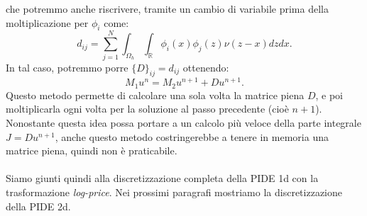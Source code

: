 \documentclass[a4paper,10pt]{report}
\theoremstyle{plain}
\theoremstyle{definition}
\theoremstyle{remark}
\begin{document}
che potremmo anche riscrivere, tramite un cambio di variabile prima della moltiplicazione per $\phi_i$ come: $$d_{ij}=\sum_{j=1}^N  \int_{\Omega_h} \int_{\mathbb{R}} \phi_i(x)\phi_j(z)\nu(z-x)dzdx.$$In tal caso, potremmo porre $\{D\}_{ij}=d_{ij}$ ottenendo:$$M_1u^n=M_2u^{n+1}+Du^{n+1}.$$Questo metodo permette di calcolare una sola volta la matrice piena $D$, e poi moltiplicarla ogni volta per la soluzione al passo precedente (cio\`e $n+1$). Nonostante questa idea possa portare a un calcolo pi\`u veloce della parte integrale $J=Du^{n+1}$, anche questo metodo costringerebbe a tenere in memoria una matrice piena, quindi non \`e praticabile.\\\\Siamo giunti quindi alla discretizzazione completa della PIDE 1d con la trasformazione \emph{log-price}. Nei prossimi paragrafi mostriamo la discretizzazione della PIDE 2d.
\end{document}
